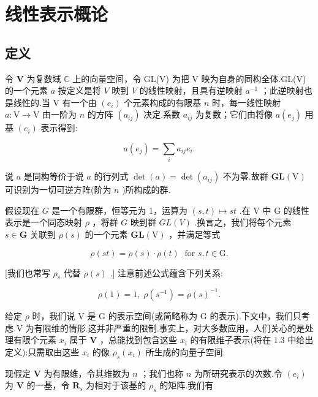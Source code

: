 \chapter{线性表示概论}

\section{定义}

令 \(\mathbf{V}\) 为复数域 \(\mathbb{C}\) 上的向量空间，令 GL(V) 为把 V 映为自身的同构全体.GL(V) 的一个元素 \(a\) 按定义是将 \(V\) 映到 \(V\) 的线性映射，且具有逆映射 \({a}^{-1}\) ；此逆映射也是线性的.当 \(\mathrm{V}\) 有一个由 \(\left( {e}_{i}\right)\) 个元素构成的有限基 \(n\) 时，每一线性映射 \(a : \mathrm{V} \rightarrow  \mathrm{V}\) 由一阶为 \(n\) 的方阵 \(\left( {a}_{ij}\right)\) 决定.系数 \({a}_{ij}\) 为复数；它们由将像 \(a\left( {e}_{j}\right)\) 用基 \(\left( {e}_{i}\right)\) 表示得到:

\[
a\left( {e}_{j}\right)  = \mathop{\sum }\limits_{i}{a}_{ij}{e}_{i}.
\]

说 \(a\) 是同构等价于说 \(a\) 的行列式 \(\det \left( a\right)  = \det \left( {a}_{ij}\right)\) 不为零.故群 \(\mathbf{{GL}}\left( \mathrm{V}\right)\) 可识别为一切可逆方阵(阶为 \(n\) )所构成的群.

假设现在 \(G\) 是一个有限群，恒等元为 1，运算为 \(\left( {s,t}\right)  \mapsto  {st}\) .在 \(\mathrm{V}\) 中 \(\mathrm{G}\) 的线性表示是一个同态映射 \(\rho\) ，将群 \(G\) 映到群 \({GL}\left( V\right)\) .换言之，我们将每个元素 \(s \in  \mathbf{G}\) 关联到 \(\rho \left( s\right)\) 的一个元素 \(\mathbf{{GL}}\left( \mathrm{V}\right)\) ，并满足等式

\[
\rho \left( {st}\right)  = \rho \left( s\right)  \cdot  \rho \left( t\right) \;\text{ for }s,t \in  \mathrm{G}.
\]

[我们也常写 \({\rho }_{s}\) 代替 \(\rho \left( s\right)\) .] 注意前述公式蕴含下列关系:

\[
\rho \left( 1\right)  = 1,\;\rho \left( {s}^{-1}\right)  = \rho {\left( s\right) }^{-1}.
\]

给定 \(\rho\) 时，我们说 \(\mathrm{V}\) 是 \(\mathrm{G}\) 的表示空间(或简略称为 G 的表示).下文中，我们只考虑 V 为有限维的情形.这并非严重的限制.事实上，对大多数应用，人们关心的是处理有限个元素 \({x}_{i}\) 属于 \(\mathbf{V}\) ，总能找到包含这些 \({x}_{i}\) 的有限维子表示(将在 1.3 中给出定义):只需取由这些 \({x}_{i}\) 的像 \({\rho }_{s}\left( {x}_{i}\right)\) 所生成的向量子空间.

现假定 \(\mathbf{V}\) 为有限维，令其维数为 \(n\) ；我们也称 \(n\) 为所研究表示的次数.令 \(\left( {e}_{i}\right)\) 为 \(\mathbf{V}\) 的一基，令 \({\mathbf{R}}_{s}\) 为相对于该基的 \({\rho }_{s}\) 的矩阵.我们有

